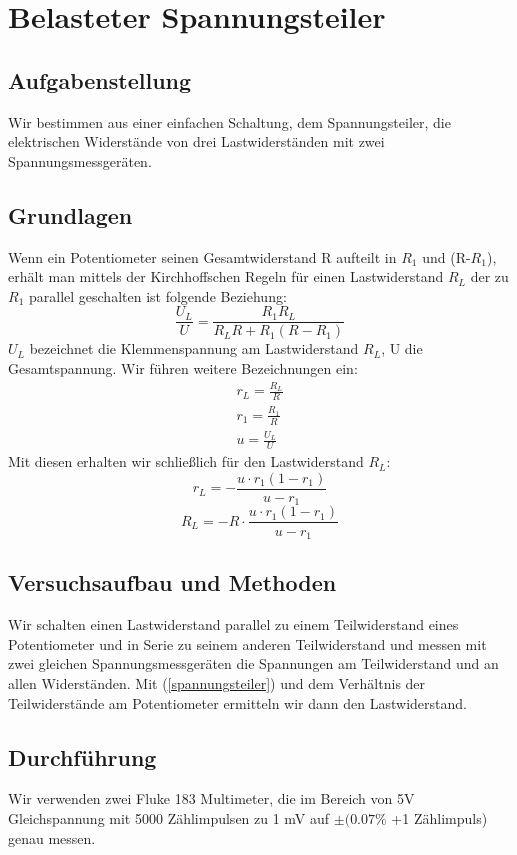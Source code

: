 \documentclass{article}
\begin{document}
\newpage

\section{Belasteter Spannungsteiler}

\subsection{Aufgabenstellung}
Wir bestimmen aus einer einfachen Schaltung, dem Spannungsteiler, die elektrischen Widerstände von drei Lastwiderständen mit zwei Spannungsmessgeräten.
\subsection{Grundlagen}
Wenn ein Potentiometer seinen Gesamtwiderstand R aufteilt in $R_1$ und (R-$R_1$), erhält man mittels der Kirchhoffschen Regeln für einen Lastwiderstand $R_L$ der zu $R_1$ parallel geschalten ist folgende Beziehung: 
\begin{equation}
\label{spannungsteiler}
\frac{U_L}{U}=\frac{R_1R_L}{R_LR+R_1(R-R_1)}
\end{equation}
$U_L$ bezeichnet die Klemmenspannung am Lastwiderstand $R_L$, U die Gesamtspannung. Wir führen weitere Bezeichnungen ein:
\begin{align*}
r_L=\frac{R_L}{R} \\
r_1=\frac{R_1}{R} \\
u = \frac{U_L}{U}
\end{align*}
Mit diesen erhalten wir schließlich für den Lastwiderstand $R_L$:
\begin{equation*}
r_L=-\frac{u\cdot r_1(1-r_1)}{u-r_1}
\end{equation*}
\begin{equation}
\label{spannungsteiler_umgeformt}
R_L=-R\cdot \frac{u\cdot r_1(1-r_1)}{u-r_1}
\end{equation}

\subsection{Versuchsaufbau und Methoden}
Wir schalten einen Lastwiderstand parallel zu einem Teilwiderstand eines Potentiometer und in Serie zu seinem anderen Teilwiderstand und messen mit zwei gleichen Spannungsmessgeräten die Spannungen am Teilwiderstand und an allen Widerständen. Mit (\ref{spannungsteiler}) und dem Verhältnis der Teilwiderstände am Potentiometer ermitteln wir dann den Lastwiderstand. 
\subsection{Durchführung}
Wir verwenden zwei Fluke 183 Multimeter, die im Bereich von 5V Gleichspannung mit 5000 Zählimpulsen zu 1 mV auf $\pm (0.07\%$ +1 Zählimpuls) genau messen.
\end{document}

